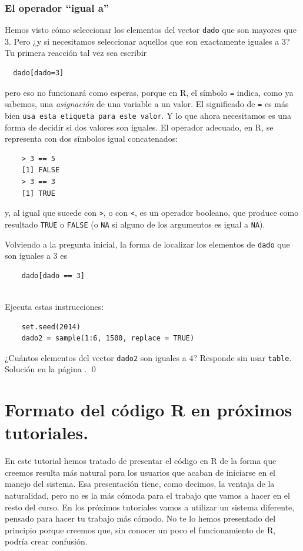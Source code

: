 \documentclass[10pt,a4paper]{article}\usepackage[]{graphicx}\usepackage[]{color}
\begin{document}
\subsubsection*{El operador ``igual a''}

Hemos visto cómo seleccionar los elementos del vector {\tt dado} que son mayores que $3$. Pero ¿y si necesitamos seleccionar aquellos que son exactamente iguales a $3$? Tu primera reacción tal vez sea escribir
\begin{verbatim}
  dado[dado=3]
\end{verbatim}
pero eso no funcionará como esperas, porque en R, el símbolo {\tt =} indica, como ya sabemos, una {\em asignación} de una variable a un valor. El significado de {\tt =} es más bien {\tt usa esta etiqueta para este valor}. Y lo que ahora necesitamos es una forma de decidir si dos valores son iguales. El operador adecuado, en R, se representa con dos símbolos igual concatenados:
\begin{verbatim}
    > 3 == 5
    [1] FALSE
    > 3 == 3
    [1] TRUE
\end{verbatim}
y, al igual que sucede con {\tt >}, o con {\tt <}, es un operador booleano, que produce como resultado {\tt TRUE} o {\tt FALSE} (o {\tt NA} si alguno de los argumentos es igual a {\tt NA}).

Volviendo a la pregunta inicial, la forma de localizar los elementos de {\tt dado} que son iguales a $3$ es
\begin{verbatim}
    dado[dado == 3]
\end{verbatim}


\begin{ejercicio}
\label{tut02:ejercicio27}
\quad\\
Ejecuta estas instrucciones:
\begin{verbatim}
    set.seed(2014)
    dado2 = sample(1:6, 1500, replace = TRUE)
\end{verbatim}
¿Cuántos elementos del vector {\tt dado2} son iguales a $4$? Responde sin usar {\tt table}. Solución en la página \pageref{tut02:ejercicio27:sol}.
\qed
\end{ejercicio}


\section{Formato del código R en próximos tutoriales.}
\label{tut02:sec:FormatoCodigoR}

En este tutorial hemos tratado de presentar el código en R de la forma que creemos resulta más natural para los usuarios que acaban de iniciarse en el manejo del sistema. Esa presentación tiene, como decimos, la ventaja de la naturalidad, pero no es la más cómoda para el trabajo que vamos a hacer en el resto del curso. En los próximos tutoriales vamos a utilizar un sistema diferente, pensado para hacer tu trabajo más cómodo. No te lo hemos presentado del principio porque creemos que, sin conocer un poco el funcionamiento de R, podría crear confusión.
\end{document}
